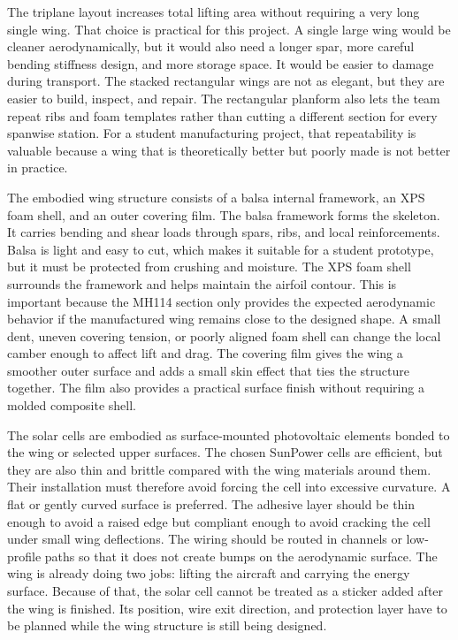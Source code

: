 The triplane layout increases total lifting area without requiring a very long single wing. That choice is practical for this project. A single large wing would be cleaner aerodynamically, but it would also need a longer spar, more careful bending stiffness design, and more storage space. It would be easier to damage during transport. The stacked rectangular wings are not as elegant, but they are easier to build, inspect, and repair. The rectangular planform also lets the team repeat ribs and foam templates rather than cutting a different section for every spanwise station. For a student manufacturing project, that repeatability is valuable because a wing that is theoretically better but poorly made is not better in practice.

The embodied wing structure consists of a balsa internal framework, an XPS foam shell, and an outer covering film. The balsa framework forms the skeleton. It carries bending and shear loads through spars, ribs, and local reinforcements. Balsa is light and easy to cut, which makes it suitable for a student prototype, but it must be protected from crushing and moisture. The XPS foam shell surrounds the framework and helps maintain the airfoil contour. This is important because the MH114 section only provides the expected aerodynamic behavior if the manufactured wing remains close to the designed shape. A small dent, uneven covering tension, or poorly aligned foam shell can change the local camber enough to affect lift and drag. The covering film gives the wing a smoother outer surface and adds a small skin effect that ties the structure together. The film also provides a practical surface finish without requiring a molded composite shell.

The solar cells are embodied as surface-mounted photovoltaic elements bonded to the wing or selected upper surfaces. The chosen SunPower cells are efficient, but they are also thin and brittle compared with the wing materials around them. Their installation must therefore avoid forcing the cell into excessive curvature. A flat or gently curved surface is preferred. The adhesive layer should be thin enough to avoid a raised edge but compliant enough to avoid cracking the cell under small wing deflections. The wiring should be routed in channels or low-profile paths so that it does not create bumps on the aerodynamic surface. The wing is already doing two jobs: lifting the aircraft and carrying the energy surface. Because of that, the solar cell cannot be treated as a sticker added after the wing is finished. Its position, wire exit direction, and protection layer have to be planned while the wing structure is still being designed.

